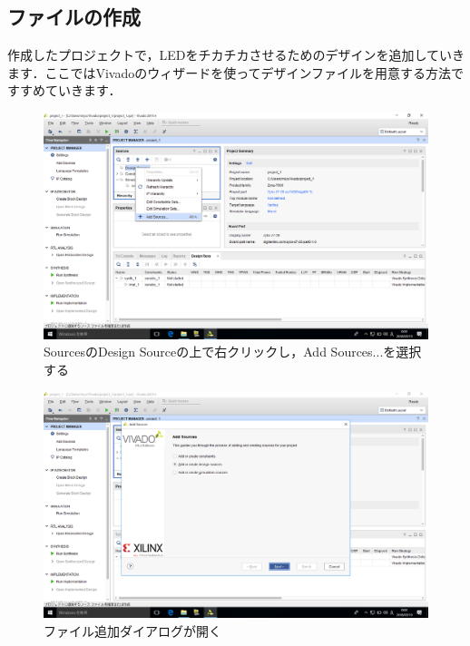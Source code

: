 \documentclass[a4paper,dvipdfmx]{jsarticle}
\begin{document}
\subsection{ファイルの作成}

作成したプロジェクトで，LEDをチカチカさせるためのデザインを追加していきます．ここではVivadoのウィザードを使ってデザインファイルを用意する方法ですすめていきます．

 \begin{figure}[H]
  \begin{center}
   \includegraphics[width=.8\textwidth]{chapter03_figures/VirtualBox_Windows10_19_03_2018_00_03_27.png}
  \end{center}
  \caption{SourcesのDesign Sourceの上で右クリックし，Add Sources...を選択する}
 \end{figure}

 \begin{figure}[H]
  \begin{center}
   \includegraphics[width=.8\textwidth]{chapter03_figures/VirtualBox_Windows10_19_03_2018_00_03_35.png}
  \end{center}
  \caption{ファイル追加ダイアログが開く}
 \end{figure}
\end{document}

